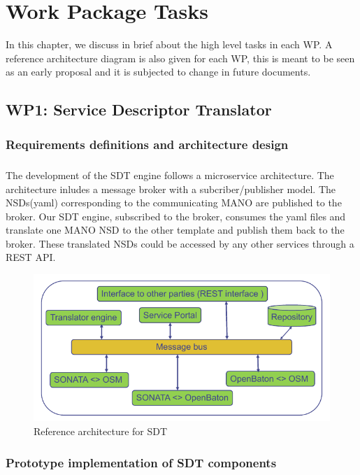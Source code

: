\chapter{Work Package Tasks}
\label{ch:wptasks}

In this chapter, we discuss in brief about the high level tasks in each WP. A reference architecture diagram is also given for each WP, this is meant to be seen as an early proposal and it is subjected to change in future documents.

\section{WP1: Service Descriptor Translator}

\subsection{Requirements definitions and architecture design}
\paragraph{}
The development of the SDT engine follows a microservice architecture. The architecture inludes a message broker with a subcriber/publisher model. The NSDs(yaml) corresponding to the communicating MANO are published to the broker. Our SDT engine, subscribed to the broker, consumes the yaml files and translate one MANO NSD to the other template and publish them back to the broker. These translated NSDs could be accessed by any other services through a REST API.
\begin{figure}[h]
	\centering
	\includegraphics[width=0.9\linewidth]{figures/wp1Arch}
	\caption{Reference architecture for SDT}
	\label{fig:wp1arch}
\end{figure}

\subsection{Prototype implementation of SDT components}

